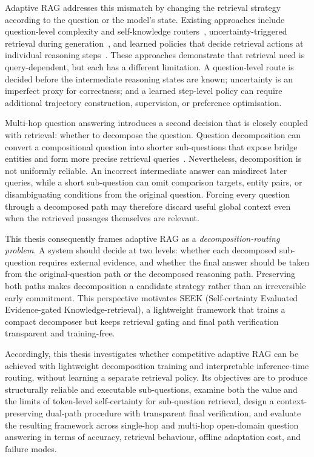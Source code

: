 \documentclass{nthu_thesis}
\begin{document}
\begin{thesiscjk}
Adaptive RAG addresses this mismatch by changing the retrieval strategy according to the question or the model's state. Existing approaches include question-level complexity and self-knowledge routers~\cite{adaptiverag,skr}, uncertainty-triggered retrieval during generation~\cite{flare,dragin}, and learned policies that decide retrieval actions at individual reasoning steps~\cite{selfrag,deeprag}. These approaches demonstrate that retrieval need is query-dependent, but each has a different limitation. A question-level route is decided before the intermediate reasoning states are known; uncertainty is an imperfect proxy for correctness; and a learned step-level policy can require additional trajectory construction, supervision, or preference optimisation.

Multi-hop question answering introduces a second decision that is closely coupled with retrieval: whether to decompose the question. Question decomposition can convert a compositional question into shorter sub-questions that expose bridge entities and form more precise retrieval queries~\cite{decomprc,break_qdmr}. Nevertheless, decomposition is not uniformly reliable. An incorrect intermediate answer can misdirect later queries, while a short sub-question can omit comparison targets, entity pairs, or disambiguating conditions from the original question. Forcing every question through a decomposed path may therefore discard useful global context even when the retrieved passages themselves are relevant.

This thesis consequently frames adaptive RAG as a \emph{decomposition-routing problem}. A system should decide at two levels: whether each decomposed sub-question requires external evidence, and whether the final answer should be taken from the original-question path or the decomposed reasoning path. Preserving both paths makes decomposition a candidate strategy rather than an irreversible early commitment. This perspective motivates SEEK (Self-certainty Evaluated Evidence-gated Knowledge-retrieval), a lightweight framework that trains a compact decomposer but keeps retrieval gating and final path verification transparent and training-free.

Accordingly, this thesis investigates whether competitive adaptive RAG can be achieved with lightweight decomposition training and interpretable inference-time routing, without learning a separate retrieval policy. Its objectives are to produce structurally reliable and executable sub-questions, examine both the value and the limits of token-level self-certainty for sub-question retrieval, design a context-preserving dual-path procedure with transparent final verification, and evaluate the resulting framework across single-hop and multi-hop open-domain question answering in terms of accuracy, retrieval behaviour, offline adaptation cost, and failure modes.


\end{thesiscjk}
\end{document}
